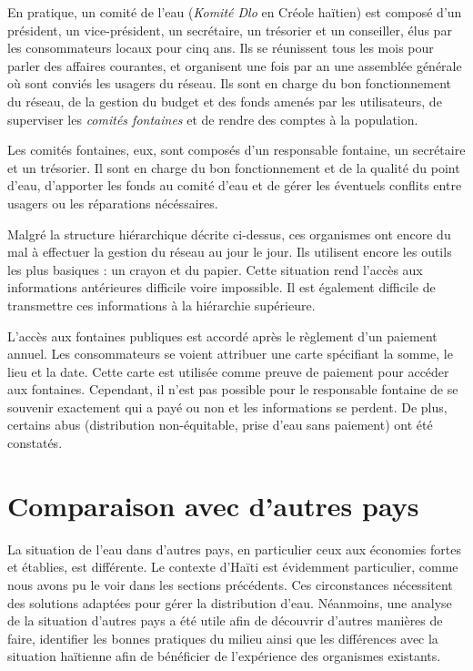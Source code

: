 \documentclass{EPL-master-thesis-covers-FR}
\begin{document}
				En pratique, un comité de l'eau (\emph{Komité Dlo} en Créole haïtien) est composé d'un président, un vice-président, un secrétaire, un trésorier et un conseiller, élus par les consommateurs locaux pour cinq ans. Ils se réunissent tous les mois pour parler des affaires courantes, et organisent une fois par an une assemblée générale où sont conviés les usagers du réseau. Ils sont en charge du bon fonctionnement du réseau, de la gestion du budget et des fonds amenés par les utilisateurs, de superviser les \emph{comités fontaines} et de rendre des comptes à la population.

				Les comités fontaines, eux, sont composés d'un responsable fontaine, un secrétaire et un trésorier. Il sont en charge du bon fonctionnement et de la qualité du point d'eau, d'apporter les fonds au comité d'eau et de gérer les éventuels conflits entre usagers ou les réparations nécéssaires.

				Malgré la structure hiérarchique décrite ci-dessus, ces organismes ont encore du mal à effectuer la gestion du réseau au jour le jour. Ils utilisent encore les outils les plus basiques : un crayon et du papier. Cette situation rend l'accès aux informations antérieures difficile voire impossible. Il est également difficile de transmettre ces informations à la hiérarchie supérieure.

				L'accès aux fontaines publiques est accordé après le règlement d'un paiement annuel. Les consommateurs se voient attribuer une carte spécifiant la somme, le lieu et la date. Cette carte est utilisée comme preuve de paiement pour accéder aux fontaines. Cependant, il n'est pas possible pour le responsable fontaine de se souvenir exactement qui a payé ou non et les informations se perdent. De plus, certains abus (distribution non-équitable, prise d'eau sans paiement) ont été constatés.


		\section{Comparaison avec d'autres pays}

			La situation de l'eau dans d'autres pays, en particulier ceux aux économies fortes et établies, est différente. Le contexte d'Haïti est évidemment particulier, comme nous avons pu le voir dans les sections précédents. Ces circonstances nécessitent des solutions adaptées pour gérer la distribution d'eau. Néanmoins, une analyse de la situation d'autres pays a été utile afin de découvrir d'autres manières de faire, identifier les bonnes pratiques du milieu ainsi que les différences avec la situation haïtienne afin de bénéficier de l'expérience des organismes existants.
\end{document}
